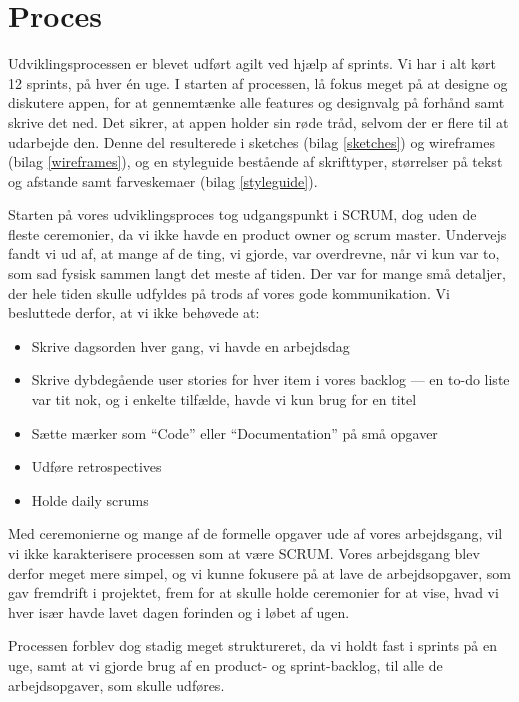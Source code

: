 \section{Proces}
Udviklingsprocessen er blevet udført agilt ved hjælp af sprints. Vi har i alt kørt 12 sprints, på hver én uge. I starten af processen, lå fokus meget på at designe og diskutere appen, for at gennemtænke alle features og designvalg på forhånd samt skrive det ned. Det sikrer, at appen holder sin røde tråd, selvom der er flere til at udarbejde den. Denne del resulterede i sketches (bilag \ref{sketches}) og wireframes (bilag \ref{wireframes}), og en styleguide bestående af skrifttyper, størrelser på tekst og afstande samt farveskemaer (bilag \ref{styleguide}).

Starten på vores udviklingsproces tog udgangspunkt i SCRUM, dog uden de fleste ceremonier, da vi ikke havde en product owner og scrum master. Undervejs fandt vi ud af, at mange af de ting, vi gjorde, var overdrevne, når vi kun var to, som sad fysisk sammen langt det meste af tiden. Der var for mange små detaljer, der hele tiden skulle udfyldes på trods af vores gode kommunikation. Vi besluttede derfor, at vi ikke behøvede at:

\begin{itemize}
   \item Skrive dagsorden hver gang, vi havde en arbejdsdag
   \item Skrive dybdegående user stories for hver item i vores backlog --- en to-do liste var tit nok, og i enkelte tilfælde, havde vi kun brug for en titel
   \item Sætte mærker som ``Code'' eller ``Documentation'' på små opgaver
    \item Udføre retrospectives
    \item Holde daily scrums
\end{itemize}

Med ceremonierne og mange af de formelle opgaver ude af vores arbejdsgang, vil vi ikke karakterisere processen som at være SCRUM.
Vores arbejdsgang blev derfor meget mere simpel, og vi kunne fokusere på at lave de arbejdsopgaver, som gav fremdrift i projektet, frem for at skulle holde ceremonier for at vise, hvad vi hver især havde lavet dagen forinden og i løbet af ugen. 

Processen forblev dog stadig meget struktureret, da vi holdt fast i sprints på en uge, samt at vi gjorde brug af en product- og sprint-backlog, til alle de arbejdsopgaver, som skulle udføres. 

